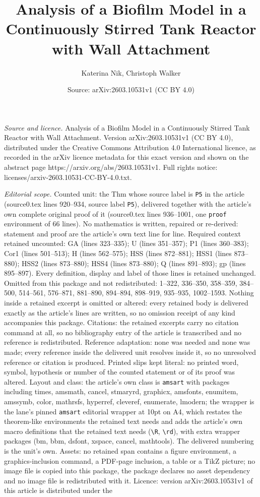 \documentclass[10pt,a4paper]{amsart}
\title[Analysis of a Biofilm Model in a Continuously Stirred Tank R]{Analysis of a Biofilm Model in a Continuously Stirred Tank Reactor with Wall Attachment}
\author{Katerina Nik, Christoph Walker}
\date{Source: arXiv:2603.10531v1 (CC BY 4.0)}
\begin{document}
\maketitle

\noindent\emph{Source and licence.} Analysis of a Biofilm Model in a Continuously Stirred Tank Reactor with Wall Attachment. Version arXiv:2603.10531v1 (CC BY 4.0), distributed under the Creative Commons Attribution 4.0 International licence, as recorded in the arXiv licence metadata for this exact version and shown on the abstract page https://arxiv.org/abs/2603.10531v1. Full rights notice: licenses/arxiv-2603.10531-CC-BY-4.0.txt.\par\smallskip

\noindent\textit{Editorial scope.} Counted unit: the Thm whose source label is \texttt{P5} in the article (source0.tex lines 920--934, source label \texttt{P5}), delivered together with the article's own complete original proof of it (source0.tex lines 936--1001, one \texttt{proof} environment of 66 lines). No mathematics is written, repaired or re-derived: statement and proof are the article's own text line for line. Required context retained uncounted: GA (lines 323--335); U (lines 351--357); P1 (lines 360--383); Cor1 (lines 501--513); H (lines 562--575); HSS (lines 872--881); HSS1 (lines 873--880); HSS2 (lines 873--880); HSS4 (lines 873--880); Q (lines 891--893); gp (lines 895--897). Every definition, display and label of those lines is retained unchanged. Omitted from this package and not redistributed: 1--322, 336--350, 358--359, 384--500, 514--561, 576--871, 881--890, 894--894, 898--919, 935--935, 1002--1593. Nothing inside a retained excerpt is omitted or altered: every retained body is delivered exactly as the article's lines are written, so no omission receipt of any kind accompanies this package. Citations: the retained excerpts carry no citation command at all, so no bibliography entry of the article is transcribed and no reference is redistributed. Reference adaptation: none was needed and none was made; every reference inside the delivered unit resolves inside it, so no unresolved reference or citation is produced. Printed slips kept literal: no printed word, symbol, hypothesis or number of the counted statement or of its proof was altered. Layout and class: the article's own class is \texttt{amsart} with packages including times, amsmath, cancel, stmaryrd, graphicx, amsfonts, enumitem, amssymb, color, mathrsfs, hyperref, cleveref, enumerate, lmodern; the wrapper is the lane's pinned \texttt{amsart} editorial wrapper at 10pt on A4, which restates the theorem-like environments the retained text needs and adds the article's own macro definitions that the retained text needs (\texttt{\textbackslash R}, \texttt{\textbackslash rd}), with extra wrapper packages (bm, bbm, dsfont, xspace, cancel, mathtools). The delivered numbering is the unit's own. Assets: no retained span contains a figure environment, a graphics-inclusion command, a PDF-page inclusion, a table or a TikZ picture; no image file is copied into this package, the package declares no asset dependency and no image file is redistributed with it. Licence: version arXiv:2603.10531v1 of this article is distributed under the 
\end{document}
